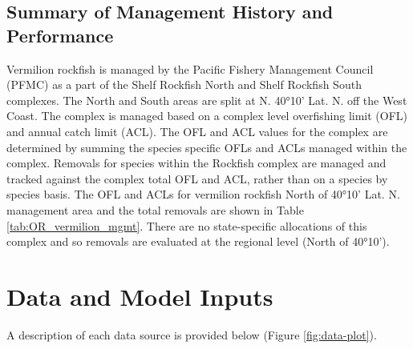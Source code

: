 \documentclass[11pt,
  english,
  a4paper,
]{article}
\begin{document}
\leavevmode\tagmcend\tagstructend\par


\hypertarget{summary-of-management-history-and-performance}{%
\subsection{Summary of Management History and Performance}\label{summary-of-management-history-and-performance}}

\leavevmode\tagmcend\tagstructend


Vermilion rockfish is managed by the Pacific Fishery Management Council (PFMC) as a part of the Shelf Rockfish North and Shelf Rockfish South complexes. The North and South areas are split at N. 40°10' Lat. N. off the West Coast. The complex is managed based on a complex level overfishing limit (OFL) and annual catch limit (ACL). The OFL and ACL values for the complex are determined by summing the species specific OFLs and ACLs managed within the complex. Removals for species within the Rockfish complex are managed and tracked against the complex total OFL and ACL, rather than on a species by species basis. The OFL and ACLs for vermilion rockfish North of 40°10' Lat. N. management area and the total removals are shown in Table \ref{tab:OR_vermilion_mgmt}. There are no state-specific allocations of this complex and so removals are evaluated at the regional level (North of 40°10').

\leavevmode\tagmcend\tagstructend\par


\hypertarget{data-and-model-inputs}{%
\section{Data and Model Inputs}\label{data-and-model-inputs}}

\leavevmode\tagmcend\tagstructend


A description of each data source is provided below (Figure \ref{fig:data-plot}).

\leavevmode\tagmcend\tagstructend\par

\end{document}
